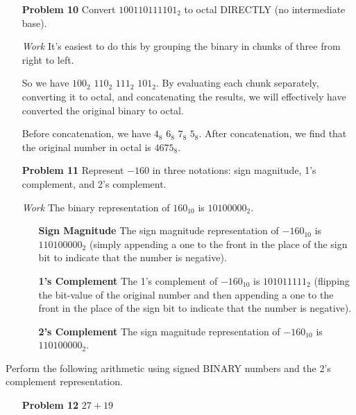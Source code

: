 \documentclass[12pt]{article}
\begin{document}
\begin{enumerate}
  \item[\textbf{Problem 10}] Convert $100110111101_2$ to octal DIRECTLY (no intermediate base).
\end{enumerate}

\begin{enumerate}
  \item[\textit{Work}] It's easiest to do this by grouping the binary in chunks of three from right to left.
  \item[] So we have $100_2$ $110_2$ $111_2$ $101_2$. By evaluating each chunk separately, converting it to octal, and concatenating the results, we will effectively have converted the original binary to octal.
  \item[] Before concatenation, we have $4_8$ $6_8$ $7_8$ $5_8$. After concatenation, we find that the original number in octal is $4675_8$.
\end{enumerate}


\begin{enumerate}
  \item[\textbf{Problem 11}] Represent $-160$ in three notations: sign magnitude, 1’s complement, and 2’s complement.
\end{enumerate}

\begin{enumerate}
  \item[\textit{Work}] The binary representation of $160_{10}$ is $10100000_2$.
  \begin{enumerate}
    \item[\textbf{Sign Magnitude}] The sign magnitude representation of $-160_{10}$ is $110100000_2$ (simply appending a one to the front in the place of the sign bit to indicate that the number is negative).
    \item[\textbf{1's Complement}] The 1's complement of $-160_{10}$ is $101011111_2$ (flipping the bit-value of the original number and then appending a one to the front in the place of the sign bit to indicate that the number is negative).
    \item[\textbf{2's Complement}] The sign magnitude representation of $-160_{10}$ is $110100000_2$.
  \end{enumerate}
\end{enumerate}

\noindent Perform the following arithmetic using signed BINARY numbers and the 2’s complement representation.
\begin{enumerate}
  \item[\textbf{Problem 12}] $27+19$
\end{enumerate}
\end{document}

